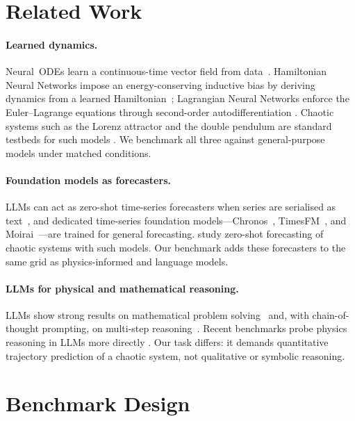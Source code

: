 \documentclass{article}
\begin{document}
\section{Related Work}

\paragraph{Learned dynamics.} Neural~ODEs learn a continuous-time vector field
from data~\citep{chen2018node}. Hamiltonian Neural Networks impose an
energy-conserving inductive bias by deriving dynamics from a learned
Hamiltonian~\citep{greydanus2019hnn}; Lagrangian Neural Networks enforce the
Euler--Lagrange equations through second-order autodifferentiation
\citep{cranmer2020lnn}. Chaotic systems such as the Lorenz attractor and the
double pendulum are standard testbeds for such models
\citep{gilpin2021chaos}. We benchmark all three against general-purpose models
under matched conditions.

\paragraph{Foundation models as forecasters.} LLMs can act as zero-shot
time-series forecasters when series are serialised as text~\citep{gruver2023llmtime},
and dedicated time-series foundation models---Chronos~\citep{ansari2024chronos},
TimesFM~\citep{das2024timesfm}, and Moirai~\citep{woo2024moirai}---are trained for
general forecasting. \citet{zhang2025zeroshotchaos} study zero-shot forecasting of
chaotic systems with such models. Our benchmark adds these forecasters to the same
grid as physics-informed and language models.

\paragraph{LLMs for physical and mathematical reasoning.} LLMs show strong results
on mathematical problem solving~\citep{lewkowycz2022minerva} and, with
chain-of-thought prompting, on multi-step reasoning~\citep{wei2022cot}. Recent
benchmarks probe physics reasoning in LLMs more directly
\citep{xu2025ugphysics}.
Our task differs: it demands quantitative trajectory prediction of a chaotic
system, not qualitative or symbolic reasoning.

\section{Benchmark Design}
\end{document}
